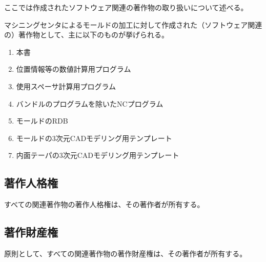 

ここでは作成されたソフトウェア関連の著作物の取り扱いについて述べる。


マシニングセンタによるモールドの加工に対して作成された（ソフトウェア関連の）著作物として、主に以下のものが挙げられる。
\begin{enumerate}
\item 本書
\item 位置情報等の数値計算用プログラム
\item 使用スペーサ計算用プログラム
\item バンドルのプログラムを除いたNCプログラム
\item モールドのRDB
\item モールドの3次元CADモデリング用テンプレート
\item 内面テーパの3次元CADモデリング用テンプレート
\end{enumerate}





\subsection{著作人格権\TBW}
すべての関連著作物の著作人格権は、その著作者が所有する。


\subsection{著作財産権\TBW}
原則として、すべての関連著作物の著作財産権は、その著作者が所有する。

